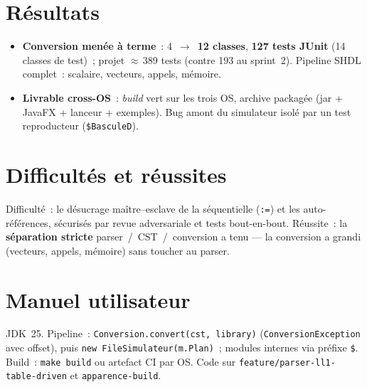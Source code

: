 \documentclass[11pt,a4paper]{article}
\begin{document}
\section*{Résultats}
\begin{itemize}
  \item \textbf{Conversion menée à terme}~: 4~$\to$~\textbf{12 classes}, \textbf{127 tests JUnit} (14 classes de test)~; projet $\approx$\,389 tests (contre 193 au sprint~2). Pipeline SHDL complet~: scalaire, vecteurs, appels, mémoire.
  \item \textbf{Livrable cross-OS}~: \emph{build} vert sur les trois OS, archive packagée (jar + JavaFX + lanceur + exemples). Bug amont du simulateur isolé par un test reproducteur (\texttt{\$BasculeD}).
\end{itemize}

\section*{Difficultés et réussites}
Difficulté~: le désucrage maître--esclave de la séquentielle (\texttt{:=}) et les auto-références, sécurisés par revue adversariale et tests bout-en-bout. Réussite~: la \textbf{séparation stricte} parser~/~CST~/~conversion a tenu --- la conversion a grandi (vecteurs, appels, mémoire) sans toucher au parser.

\section*{Manuel utilisateur}
JDK~25. Pipeline~: \texttt{Conversion.convert(cst, library)} (\texttt{ConversionException} avec offset), puis \texttt{new FileSimulateur(m.Plan)}~; modules internes via préfixe \texttt{\$}. Build~: \texttt{make build} ou artefact CI par OS. Code sur \texttt{feature/parser-ll1-table-driven} et \texttt{apparence-build}.
\end{document}
